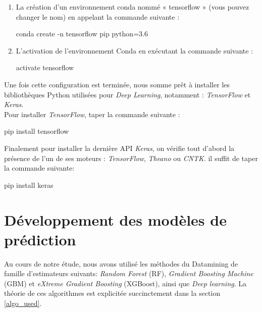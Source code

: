 \begin{enumerate}
\item La création d'un environnement conda nommé « tensorflow » (vous pouvez changer le nom) en appelant la commande suivante :
\begin{tcolorbox}
\normalsize conda create -n tensorflow pip python=3.6
\end{tcolorbox}	
\item L'activation de l'environnement Conda en exécutant la commande suivante :\\
\begin{tcolorbox}
\normalsize activate tensorflow
\end{tcolorbox}	
\end{enumerate}
Une fois cette configuration est terminée, nous somme prêt à installer les bibliothèques Python utilisées pour \textit{Deep Learning}, notamment : \textit{TensorFlow} et \textit{Keras}.\\

Pour installer \textit{TensorFlow}, taper la commande suivante :
\begin{tcolorbox}
\normalsize pip install tensorflow
\end{tcolorbox}


Finalement pour installer la dernière API \textit{Keras}, on vérifie tout d'abord la présence de l’un de ses moteurs : \textit{TensorFlow}, \textit{Theano} ou \textit{CNTK}. 
il suffit de taper la commande suivante:\\
\begin{tcolorbox}
\normalsize pip install keras
\end{tcolorbox}




\section{Développement des modèles de prédiction}
Au cours de notre étude, nous avons utilisé les méthodes du Datamining de famille d’estimateurs suivants: \textit{Random Forest} (RF), \textit{ Gradient Boosting Machine} (GBM) et \textit{eXtreme Gradient Boosting} (XGBoost), ainsi que \textit{Deep learning}. La théorie de ces algorithmes est explicitée succinctement dans la section \ref{algo_used}.\\

